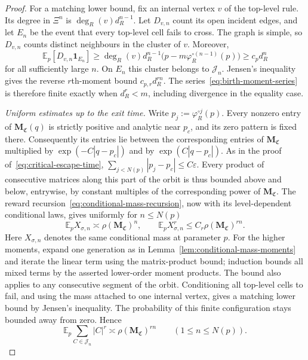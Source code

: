 \begin{proof}
For a matching lower bound, fix an internal vertex $v$ of the top-level rule.
Its degree in $\Xi^n$ is $\deg_R(v)d_R^{n-1}$.
Let $D_{v,n}$ count its open incident edges, and let $E_n$ be the event that every top-level cell fails to cross.
The graph is simple, so $D_{v,n}$ counts distinct neighbours in the cluster of $v$.
Moreover,
\[
 \mathbb E_p[D_{v,n}\mathbf1_{E_n}]
 \ge\deg_R(v)d_R^{n-1}
 \bigl(p-m\varphi_R^{\circ(n-1)}(p)\bigr)
 \ge c_pd_R^n
\]
for all sufficiently large $n$.
On $E_n$ this cluster belongs to $\mathcal J_n$.
Jensen's inequality gives the reverse $r$th-moment bound $c_{p,r}d_R^{rn}$.
The series~\eqref{eq:birth-moment-series} is therefore finite exactly when $d_R^r<m$, including divergence in the equality case.

\emph{Uniform estimates up to the exit time.}
Write $p_j:=\varphi_R^{\circ j}(p)$.
Every nonzero entry of $\mathbf M_{\mathfrak C}(q)$ is strictly positive and analytic near $p_c$, and its zero pattern is fixed there.
Consequently its entries lie between the corresponding entries of $\mathbf M_{\mathfrak C}$ multiplied by $\exp(-C|q-p_c|)$ and by $\exp(C|q-p_c|)$.
As in the proof of~\eqref{eq:critical-escape-time},
$\sum_{j<N(p)}|p_j-p_c|\le C\varepsilon$.
Every product of consecutive matrices along this part of the orbit is thus bounded above and below, entrywise, by constant multiples of the corresponding power of $\mathbf M_{\mathfrak C}$.
The reward recursion~\eqref{eq:conditional-mass-recursion}, now with its level-dependent conditional laws, gives uniformly for $n\le N(p)$
\[
 \mathbb E_p X_{\sigma,n}\asymp\rho(\mathbf M_{\mathfrak C})^n,
 \qquad
 \mathbb E_p X_{\sigma,n}^r\le C_r\rho(\mathbf M_{\mathfrak C})^{rn}.
\]
Here $X_{\sigma,n}$ denotes the same conditional mass at parameter $p$.
For the higher moments, expand one generation as in Lemma~\ref{lem:conditional-mass-moments} and iterate the linear term using the matrix-product bound; induction bounds all mixed terms by the asserted lower-order moment products.
The bound also applies to any consecutive segment of the orbit.
Conditioning all top-level cells to fail, and using the mass attached to one internal vertex, gives a matching lower bound by Jensen's inequality.
The probability of this finite configuration stays bounded away from zero.
Hence
\begin{equation}\label{eq:pre-exit-birth-moment}
 \mathbb E_p\sum_{C\in\mathcal J_n}|C|^r
 \asymp\rho(\mathbf M_{\mathfrak C})^{rn}
 \qquad(1\le n\le N(p)).
\end{equation}


\end{proof}
